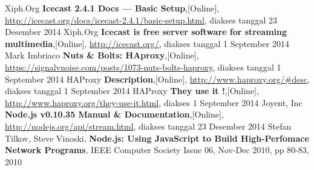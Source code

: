 \begin{thebibliography}{9}
		 Xiph.Org
		 \textbf{Icecast 2.4.1 Docs — Basic Setup},[Online],
		 \url{http://icecast.org/docs/icecast-2.4.1/basic-setup.html},
		 diakses tanggal 23 Desember 2014
		Xiph.Org
		\textbf{Icecast is free server software for streaming multimedia},[Online],
		\url{http://icecast.org/},
		diakses tanggal 1 September 2014
		Mark Imbriaco
		\textbf{Nuts \& Bolts: HAproxy},[Online],
		\url{https://signalvnoise.com/posts/1073-nuts-bolts-haproxy},
		diakses tanggal 1 September 2014
		HAProxy
		\textbf{Description},[Online],
		\url{http://www.haproxy.org/#desc},
		diakses tanggal 1 September 2014
		HAProxy
		\textbf{They use it !},[Online],
		\url{http://www.haproxy.org/they-use-it.html},
		diakses 1 September 2014
		Joyent, Inc
		\textbf{Node.js v0.10.35 Manual \& Documentation},[Online],
		\url{http://nodejs.org/api/stream.html},
		diakses tanggal 23 Desember 2014
		Stefan Tilkov, Steve Vinoski,
		\textbf{Node.js: Using JavaScript to Build High-Perfomace Network Programs},
		IEEE Computer Society Issue 06, Nov-Dec 2010,
		pp 80-83, 2010
	
\end{thebibliography}